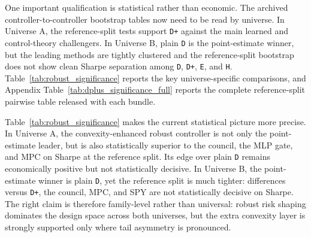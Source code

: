 \documentclass[10pt,twocolumn]{article}
\begin{document}
One important qualification is statistical rather than economic. The archived
controller-to-controller bootstrap tables now need to be read by universe. In
Universe A, the reference-split tests support \texttt{D+} against the main
learned and control-theory challengers. In Universe B, plain \texttt{D} is the
point-estimate winner, but the leading methods are tightly clustered and the
reference-split bootstrap does not show clean Sharpe separation among
\texttt{D}, \texttt{D+}, \texttt{E}, and \texttt{H}. Table~\ref{tab:robust_significance}
reports the key universe-specific comparisons, and Appendix
Table~\ref{tab:dplus_significance_full} reports the complete reference-split
pairwise table released with each bundle.

\begin{table}[t]
\centering
\small
\caption{Reference-split Sharpe deltas for the universe-specific robust winner
against key challengers under the cached block-bootstrap evaluation.}
\label{tab:robust_significance}
\end{table}

Table~\ref{tab:robust_significance} makes the current statistical picture more
precise. In Universe A, the convexity-enhanced robust controller is not only
the point-estimate leader, but is also statistically superior to the council,
the MLP gate, and MPC on Sharpe at the reference split. Its edge over plain
\texttt{D} remains economically positive but not statistically decisive. In
Universe B, the point-estimate winner is plain \texttt{D}, yet the reference
split is much tighter: differences versus \texttt{D+}, the council, MPC, and
SPY are not statistically decisive on Sharpe. The right claim is therefore
family-level rather than universal: robust risk shaping dominates the design
space across both universes, but the extra convexity layer is strongly
supported only where tail asymmetry is pronounced.
\end{document}
